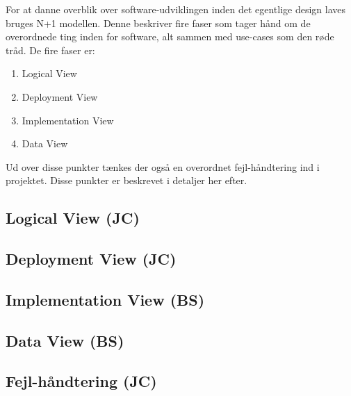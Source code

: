 For at danne overblik over software-udviklingen inden det egentlige design laves bruges N+1 modellen.
Denne beskriver fire faser som tager hånd om de overordnede ting inden for software, alt sammen med use-cases som den røde tråd.
De fire faser er:

\begin{enumerate}
	\item Logical View
	\item Deployment View
	\item Implementation View
	\item Data View
\end{enumerate}

Ud over disse punkter tænkes der også en overordnet fejl-håndtering ind i projektet. Disse punkter er beskrevet i detaljer her efter.


\subsection{Logical View (JC)}


\clearpage
\subsection{Deployment View (JC)}



\subsection{Implementation View (BS)}


\subsection{Data View (BS)}


\subsection{Fejl-håndtering (JC)}


%